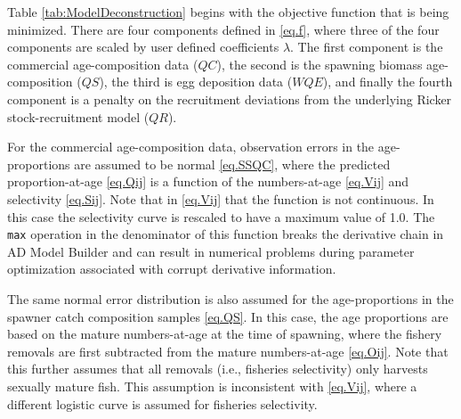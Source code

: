 \documentclass[12pt,letterpaper]{article}
\begin{document}
    Table \ref{tab:ModelDeconstruction} begins with the objective function that is being minimized.   There are four components defined in \eqref{eq.f}, where three of the four components are scaled by user defined coefficients $\lambda$.  The first component is the commercial age-composition data ($QC$), the second is the spawning biomass age-composition ($QS$), the third is egg deposition data ($WQE$), and finally the fourth component is a penalty on the recruitment deviations from the underlying Ricker stock-recruitment model ($QR$).

    For the commercial age-composition data, observation errors in the age-proportions are assumed to be normal \eqref{eq.SSQC}, where the predicted proportion-at-age \eqref{eq.Qij} is a function of the numbers-at-age \eqref{eq.Vij} and selectivity \eqref{eq.Sij}. Note that in \eqref{eq.Vij} that the function is not continuous. In this case the selectivity curve is rescaled to have a maximum value of 1.0. The \texttt{max} operation in the denominator of this function breaks the derivative chain in AD Model Builder and can result in numerical problems during parameter optimization associated with corrupt derivative information. 

    The same normal error distribution is also assumed for the age-proportions in the spawner catch composition samples \eqref{eq.QS}.  In this case, the age proportions are based on the mature numbers-at-age at the time of spawning, where the fishery removals are first subtracted from the mature numbers-at-age \eqref{eq.Oij}.  Note that this further assumes that all removals (i.e., fisheries selectivity) only harvests sexually mature fish.  This assumption is inconsistent with \eqref{eq.Vij}, where a different logistic curve is assumed for fisheries selectivity.  
\end{document}
